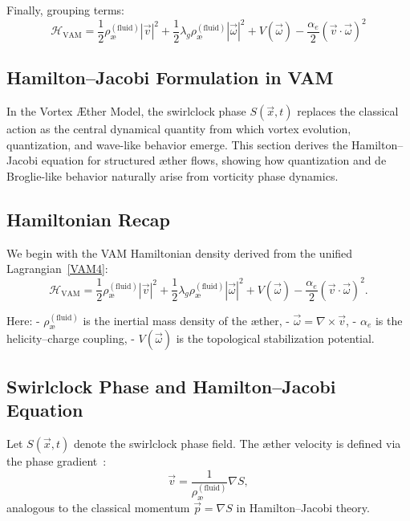 Finally, grouping terms:
\begin{equation}
\boxed{
\mathcal{H}_\text{VAM} = \frac{1}{2} \rho_\text{\ae}^{(\text{fluid})} |\vec{v}|^2
+ \frac{1}{2} \lambda_g \rho_\text{\ae}^{(\text{fluid})} |\vec{\omega}|^2
+ V(\vec{\omega})
- \frac{\alpha_e}{2} (\vec{v} \cdot \vec{\omega})^2
}
\end{equation}

\subsection{ Hamilton--Jacobi Formulation in VAM}

In the Vortex \AE ther Model, the swirlclock phase \( S(\vec{x}, t) \) replaces the classical action as the central dynamical quantity from which vortex evolution, quantization, and wave-like behavior emerge. This section derives the Hamilton--Jacobi equation for structured \ae ther flows, showing how quantization and de Broglie-like behavior naturally arise from vorticity phase dynamics.

\subsection*{Hamiltonian Recap}

We begin with the VAM Hamiltonian density derived from the unified Lagrangian~\ref{VAM4}:
\begin{equation}
\mathcal{H}_\text{VAM} = \frac{1}{2} \rho_\text{\ae}^{(\text{fluid})} |\vec{v}|^2
+ \frac{1}{2} \lambda_g \rho_\text{\ae}^{(\text{fluid})} |\vec{\omega}|^2
+ V(\vec{\omega}) - \frac{\alpha_e}{2} (\vec{v} \cdot \vec{\omega})^2.
\end{equation}

Here:
- \( \rho_\text{\ae}^{(\text{fluid})} \) is the inertial mass density of the æther,
- \( \vec{\omega} = \nabla \times \vec{v} \),
- \( \alpha_e \) is the helicity–charge coupling,
- \( V(\vec{\omega}) \) is the topological stabilization potential.

\subsection*{Swirlclock Phase and Hamilton--Jacobi Equation}

Let \( S(\vec{x}, t) \) denote the swirlclock phase field. The \ae ther velocity is defined via the phase gradient~\cite{Arnold1998,moffatt1969degree}:
\begin{equation}
\vec{v} = \frac{1}{\rho_\text{\ae}^{(\text{fluid})}} \nabla S,
\end{equation}
analogous to the classical momentum \( \vec{p} = \nabla S \) in Hamilton–Jacobi theory.

